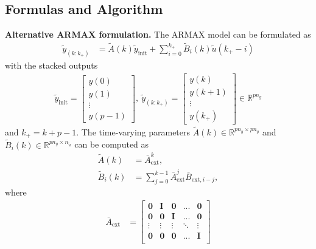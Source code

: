 \documentclass{article}
\begin{document}
\subsection{Formulas and Algorithm}
\setcounter{equation}{6}
\begin{theorem} \label{prop:ARMAXreform}\textbf{Alternative ARMAX formulation.} 
The ARMAX model can be formulated as 
\begin{align}
    \tilde{y}_{(k:k_+)} &= {\tilde{A}(k) \tilde{y}_\text{init}} +  \sum_{i=0}^{k_+}\tilde{B}_{i}(k) \tilde{u}(k_+-i) \label{eq:ARMAXtvp}
\end{align}
with the stacked outputs
\begin{align}
    \tilde{y}_\text{init}= \begin{bmatrix}
        y(0) \\
        y(1) \\
        \vdots\\
        y(p-1)
    \end{bmatrix},~ 
    \tilde{y}_{(k:k_+)}= \begin{bmatrix}
        y(k) \\
        y(k+1) \\
        \vdots\\
        y(k_+)
    \end{bmatrix}\in \mathbb{R}^{pn_y} \label{eq:ytilde}    
\end{align}
and $k_+ = k+p-1$. 
The time-varying parameters $\tilde{A}(k) \in \mathbb{R}^{pn_y \times pn_y}$ 
and $\tilde{B}_{i}(k) \in \mathbb{R}^{pn_y \times n_{\tilde{u}}}$ 
can be computed as
\begin{subequations}\label{eq:ARMAXtvp_param}
    \begin{align}    
    \tilde{A}(k) &= \bar{A}_\text{ext}^{k}, \label{eq:ARMAXtvp_paramA} \\
    \tilde{B}_{i}(k) &=  \sum_{j=0}^{k-1} \bar{A}_\text{ext}^{j} \bar{B}_{\text{ext},i-j},  
    \label{eq:ARMAXtvp_paramB}
\end{align}
\end{subequations}
where 
\begin{align}  
    \bar{A}_\text{ext} &= \begin{bmatrix}  
        \mathbf{0} &\mathbf{I} & \mathbf{0} & ... & \mathbf{0}  \\
        \mathbf{0} &\mathbf{0} & \mathbf{I} & ... & \mathbf{0}  \\
        \vdots & \vdots & \vdots  & \ddots & \vdots \\
        \mathbf{0} & \mathbf{0} & \mathbf{0} & ... & \mathbf{I} \\

\end{bmatrix}
\end{align}
\end{theorem}
\end{document}
